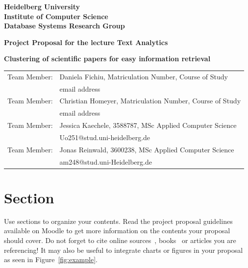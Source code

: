 \documentclass[
     12pt,         %
     a4paper,      %
     BCOR10mm,     %
     DIV14,        %
     ]{article}
\begin{document}
\begin{titlepage}


\vspace*{1cm}
\begin{center}
\vspace*{3cm}
\textbf{ 
\Large Heidelberg University\\
\smallskip
\Large Institute of Computer Science\\
\smallskip
\Large Database Systems Research Group\\
\smallskip
}

\vspace{3cm}

\textbf{\large Project Proposal for the lecture Text Analytics}

\vspace{0.5\baselineskip}
{\huge
\textbf{Clustering of scientific papers for easy information retrieval}
}
\end{center}

\vfill 

{\large
\begin{tabular}[l]{ll}
Team Member: & Daniela Fichiu, Matriculation Number, Course of Study\\
  & email address\\
Team Member: & Christian Homeyer, Matriculation Number, Course of Study\\
  & email address\\
Team Member: & Jessica Kaechele, 3588787, MSc Applied Computer Science\\
  & Uo251@stud.uni-heidelberg.de\\
Team Member: & Jonas Reinwald, 3600238, MSc Applied Computer Science\\
  & am248@stud.uni-Heidelberg.de\\
  
\end{tabular}
}

\end{titlepage}






\section{Section}

Use sections to organize your contents. Read the project proposal guidelines available on Moodle to get more information on the contents your proposal should cover. Do not forget to cite online sources~\cite{WFR2017}, books~\cite{goldberg2017neural} or articles you are referencing! It may also be useful to integrate charts or figures in your proposal as seen in Figure~\ref{fig:example}.
\end{document}
